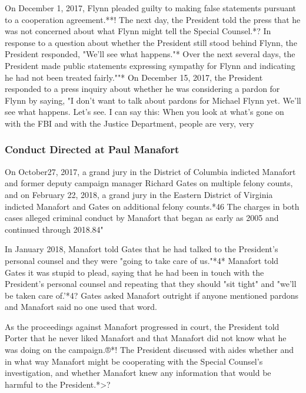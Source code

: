 On December 1, 2017, Flynn pleaded guilty to making false statements pursuant to a cooperation agreement.**!
The next day, the President told the press that he was not concerned about what Flynn might tell the Special Counsel.*?
In response to a question about whether the President still stood behind Flynn, the President responded, "We'll see what happens."*
Over the next several days, the President made public statements expressing sympathy for Flynn and indicating he had not been treated fairly.""*
On December 15, 2017, the President responded to a press inquiry about whether he was considering a pardon for Flynn by saying, "I don't want to talk about pardons for Michael Flynn yet.
We'll see what happens.
Let's see.
I can say this: When you look at what's gone on with the FBI and with the Justice Department, people are very, very

\subsubsection{Conduct Directed at Paul Manafort}

On October27, 2017, a grand jury in the District of Columbia indicted Manafort and former deputy campaign manager Richard Gates on multiple felony counts, and on February 22, 2018, a grand jury in the Eastern District of Virginia indicted Manafort and Gates on additional felony counts.*46
The charges in both cases alleged criminal conduct by Manafort that began as early as 2005 and continued through 2018.84"

In January 2018, Manafort told Gates that he had talked to the President's personal counsel and they were "going to take care of us."*4*
Manafort told Gates it was stupid to plead, saying that he had been in touch with the President's personal counsel and repeating that they should "sit tight" and "we'll be taken care of.'*4?
Gates asked Manafort outright if anyone mentioned pardons and Manafort said no one used that word.

As the proceedings against Manafort progressed in court, the President told Porter that he never liked Manafort and that Manafort did not know what he was doing on the campaign.®*!
The President discussed with aides whether and in what way Manafort might be cooperating with the Special Counsel's investigation, and whether Manafort knew any information that would be harmful to the President.*>?

